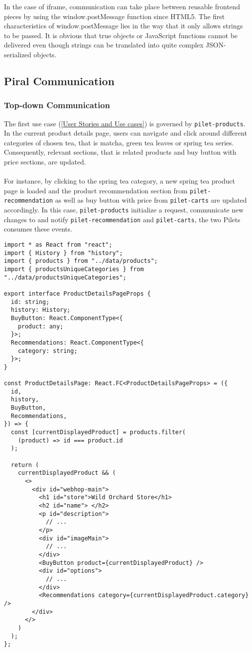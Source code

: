 \documentclass[a4paper]{book}
\begin{document}
In the case of iframe, communication can take place between reusable frontend pieces by using the window.postMessage function since HTML5. The first characteristics of window.postMessage lies in the way that it only allows strings to be passed. It is obvious that true objects or JavaScript functions cannot be delivered even though strings can be translated into quite complex JSON-serialized objects. 

\subsection{Piral Communication}
\subsubsection{Top-down Communication}
The first use case (\ref{User Stories and Use cases}) is governed by \verb|pilet-products|. In the current product details page, users can navigate and click around different categories of chosen tea, that is matcha, green tea leaves or spring tea series. Consequently, relevant sections, that is related products and buy button with price sections, are updated.
\\ \\
For instance, by clicking to the spring tea category, a new spring tea product page is loaded and the product recommendation section from \verb|pilet-recommendation| as well as buy button with price from \verb|pilet-carts| are updated accordingly. In this case, \verb|pilet-products| initialize a request, communicate new changes to and notify \verb|pilet-recommendation| and \verb|pilet-carts|, the two Pilets consumes these events.

\begin{lstlisting}[caption={pilet-products ProductDetailsPage.tsx}]
import * as React from "react";
import { History } from "history";
import { products } from "../data/products";
import { productsUniqueCategories } from "../data/productsUniqueCategories";

export interface ProductDetailsPageProps {
  id: string;
  history: History;
  BuyButton: React.ComponentType<{
    product: any;
  }>;
  Recommendations: React.ComponentType<{
    category: string;
  }>;
}

const ProductDetailsPage: React.FC<ProductDetailsPageProps> = ({
  id,
  history,
  BuyButton,
  Recommendations,
}) => {
  const [currentDisplayedProduct] = products.filter(
    (product) => id === product.id
  );

  return (
    currentDisplayedProduct && (
      <>
        <div id="webhop-main">
          <h1 id="store">Wild Orchard Store</h1>
          <h2 id="name"> </h2>
          <p id="description">
            // ...
          </p>
          <div id="imageMain">
            // ...
          </div>
          <BuyButton product={currentDisplayedProduct} />
          <div id="options">
            // ...
          </div>
          <Recommendations category={currentDisplayedProduct.category} />
        </div>
      </>
    )
  );
};
\end{lstlisting}
\end{document}
